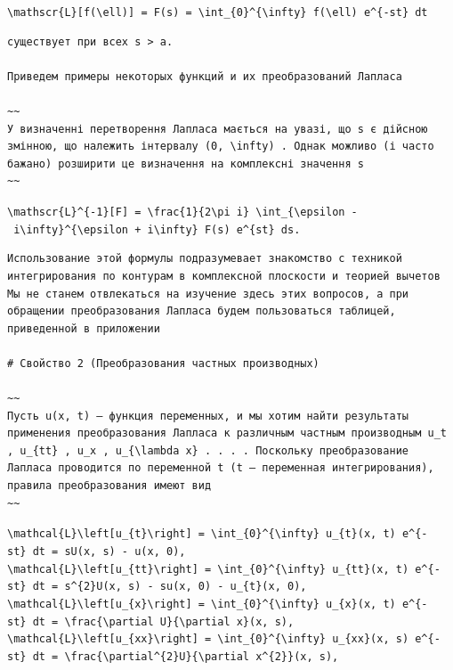 \documentclass[
  ukrainian,
]{article}
\begin{document}
\texttt{\textbackslash{}mathscr\{L\}{[}f(\textbackslash{}ell){]}\ =\ F(s)\ =\ \textbackslash{}int\_\{0\}\^{}\{\textbackslash{}infty\}\ f(\textbackslash{}ell)\ e\^{}\{-st\}\ dt}

\begin{verbatim}
существует при всех s > a.

Приведем примеры некоторых функций и их преобразований Лапласа

~~
У визначенні перетворення Лапласа мається на увазі, що s є дійсною змінною, що належить інтервалу (0, \infty) . Однак можливо (і часто бажано) розширити це визначення на комплексні значення s
~~
\end{verbatim}

\texttt{\textbackslash{}mathscr\{L\}\^{}\{-1\}{[}F{]}\ =\ \textbackslash{}frac\{1\}\{2\textbackslash{}pi\ i\}\ \textbackslash{}int\_\{\textbackslash{}epsilon\ -\ i\textbackslash{}infty\}\^{}\{\textbackslash{}epsilon\ +\ i\textbackslash{}infty\}\ F(s)\ e\^{}\{st\}\ ds.}

\begin{verbatim}
Использование этой формулы подразумевает знакомство с техникой интегрирования по контурам в комплексной плоскости и теорией вычетов Мы не станем отвлекаться на изучение здесь этих вопросов, а при обращении преобразования Лапласа будем пользоваться таблицей, приведенной в приложении

# Свойство 2 (Преобразования частных производных)

~~
Пусть u(x, t) — функция переменных, и мы хотим найти результаты применения преобразования Лапласа к различным частным производным u_t , u_{tt} , u_x , u_{\lambda x} . . . . Поскольку преобразование Лапласа проводится по переменной t (t — переменная интегрирования), правила преобразования имеют вид
~~
\end{verbatim}

\texttt{\textbackslash{}mathcal\{L\}\textbackslash{}left{[}u\_\{t\}\textbackslash{}right{]}\ =\ \textbackslash{}int\_\{0\}\^{}\{\textbackslash{}infty\}\ u\_\{t\}(x,\ t)\ e\^{}\{-st\}\ dt\ =\ sU(x,\ s)\ -\ u(x,\ 0),}
\texttt{\textbackslash{}mathcal\{L\}\textbackslash{}left{[}u\_\{tt\}\textbackslash{}right{]}\ =\ \textbackslash{}int\_\{0\}\^{}\{\textbackslash{}infty\}\ u\_\{tt\}(x,\ t)\ e\^{}\{-st\}\ dt\ =\ s\^{}\{2\}U(x,\ s)\ -\ su(x,\ 0)\ -\ u\_\{t\}(x,\ 0),}
\texttt{\textbackslash{}mathcal\{L\}\textbackslash{}left{[}u\_\{x\}\textbackslash{}right{]}\ =\ \textbackslash{}int\_\{0\}\^{}\{\textbackslash{}infty\}\ u\_\{x\}(x,\ t)\ e\^{}\{-st\}\ dt\ =\ \textbackslash{}frac\{\textbackslash{}partial\ U\}\{\textbackslash{}partial\ x\}(x,\ s),}
\texttt{\textbackslash{}mathcal\{L\}\textbackslash{}left{[}u\_\{xx\}\textbackslash{}right{]}\ =\ \textbackslash{}int\_\{0\}\^{}\{\textbackslash{}infty\}\ u\_\{xx\}(x,\ s)\ e\^{}\{-st\}\ dt\ =\ \textbackslash{}frac\{\textbackslash{}partial\^{}\{2\}U\}\{\textbackslash{}partial\ x\^{}\{2\}\}(x,\ s),}
\end{document}
